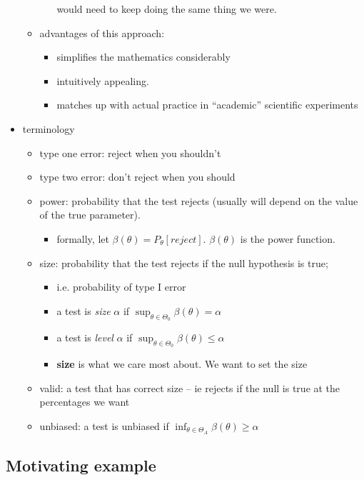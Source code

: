 \begin{itemize}
\begin{itemize}
\begin{itemize}
           would need to keep doing the same thing we were.
\end{itemize}
\item advantages of this approach:
\begin{itemize}
\item simplifies the mathematics considerably
\item intuitively appealing.
\item matches up with actual practice in ``academic'' scientific experiments
\end{itemize}
\end{itemize}
\item terminology
\begin{itemize}
\item type one error: reject when you shouldn't
\item type two error: don't reject when you should
\item power: probability that the test rejects (usually will depend
         on the value of the true parameter).
\begin{itemize}
\item formally, let $\beta(\theta) = P_\theta[reject]$.  $\beta(\theta)$ is the power function.
\end{itemize}
\item size: probability that the test rejects if the null hypothesis is true;
\begin{itemize}
\item i.e. probability of type I error
\item a test is \emph{size} $\alpha$ if $\sup_{\theta \in \Theta_0} \beta(\theta) = \alpha$
\item a test is \emph{level} $\alpha$ if $\sup_{\theta \in \Theta_0} \beta(\theta) \leq \alpha$
\item \textbf{size} is what we care most about.  We want to set the size
\end{itemize}
\item valid: a test that has correct size -- ie rejects if the null
         is true at the percentages we want
\item unbiased: a test is unbiased if $\inf_{\theta \in \Theta_A} \beta(\theta) \geq \alpha$
\end{itemize}
\end{itemize}

\subsection{Motivating example}

